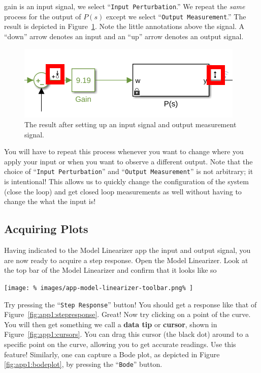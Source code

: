 gain is an input signal, we select ``\texttt{Input Perturbation}.'' We repeat
the \emph{same} process for the output
of \(P(s)\) except we select ``\texttt{Output Measurement}.'' The result is
depicted in Figure~\ref{fig:app1:io-signals}. Note the little annotations
above the signal. A ``down'' arrow denotes an input and an ``up'' arrow denotes
an output signal.
%
\begin{figure}
  \centering
  \includegraphics[width=0.8\linewidth]{images/app-model-linearizer-io-3.png}
  \caption{%
    The result after setting up an input signal and output
    measurement signal.%
  }
  \label{fig:app1:io-signals}
\end{figure}
%
You will have to repeat this process whenever you want to change where you
apply your input or when you want to observe a different output. Note that
the choice of ``\texttt{Input Perturbation}'' and
``\texttt{Output Measurement}'' is not arbitrary; it is intentional! This
allows us to quickly change the configuration of the system (close the loop)
and get closed loop measurements as well without having to change the
what the input is!

\FloatBarrier
\subsection{Acquiring Plots}
\label{App:Simulink:ModelLinearizer:3}
Having indicated to the Model Linearizer app the input and output signal, you
are now ready to acquire a step response. Open the Model Linearizer. Look at
the top bar of the Model Linearizer and confirm that it looks like so
%
\begin{center}
  \texttt{[image: \%
    images/app-model-linearizer-toolbar.png\%
  ]}
\end{center}
%
Try pressing the ``\texttt{Step Response}'' button! You should get a response
like that of Figure~\ref{fig:app1:stepresponse}. Great! Now try clicking
on a point of the curve. You will then get something we call a \textbf{data
tip} or \textbf{cursor}, shown in Figure~\ref{fig:app1:cursors}.
You can drag this cursor (the black dot) around to a specific point on the
curve, allowing you to get accurate readings. Use this feature!
%
Similarly, one can capture a Bode plot, as depicted in Figure
\ref{fig:app1:bodeplot}, by pressing the ``\texttt{Bode}'' button.

